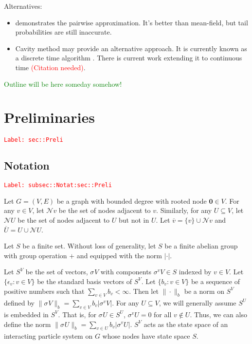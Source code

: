 \documentclass[12pt]{article}
\newcommand{\mc}{\mathcal}
\newcommand{\ov}{\overline}
\newcommand{\ep}{\epsilon}
\newcommand{\tr}{\textcolor{red}}
\newcommand{\tg}{\textcolor{green}}
\newcommand{\labe}[1]{\tr{\texttt{Label: #1}}}
\newcommand{\ind}{\hspace{24pt}}
\newcommand{\neigh}{\mc{N}}					%
\renewcommand{\root}{\mathbf{0}}				%
\renewcommand{\v}{v}							%
\renewcommand{\U}{U}							%
\newcommand{\cl}{\ov}							%
\renewcommand{\S}{S}							%
\newcommand{\s}{\sigma}							%
\newcommand{\sv}[1]{\s^{#1}}					%
\renewcommand{\b}[1]{b_{#1}}					%
\newcommand{\ev}[1]{\ep_{#1}}					%
\renewcommand{\G}{G}								%
\newcommand{\V}{V}									%
\newcommand{\E}{E}									%
\newcommand{\XState}[1]{\S^{#1}}				%
\begin{document}
Alternatives:

\begin{itemize}
\item \cite{Gas15} demonstrates the pairwise approximation. It's better than mean-field, but tail probabilities are still inaccurate.

\item Cavity method may provide an alternative approach. It is currently known as a discrete time algorithm \cite{Lac15}\cite{KanMon11}. There is current work extending it to continuous time \tr{(Citation needed)}.
\end{itemize}

\tg{Outline will be here someday somehow!}


\section{Preliminaries}
\label{sec::Preli}\labe{sec::Preli}

\subsection{Notation}
\label{subsec::Notat:sec::Preli}\labe{subsec::Notat:sec::Preli}

Let \(\G = (\V,\E)\) be a graph with bounded degree with rooted node \(\root \in \V\). For any \(\v \in \V\), let \(\neigh{\v}\) be the set of nodes adjacent to \(\v\). Similarly, for any \(\U \subseteq \V\), let \(\neigh{\U}\) be the set of nodes adjacent to \(\U\) but not in \(\U\). Let \(\cl{\v} = \{\v\}\cup\neigh{\v}\) and \(\cl{\U} = \U\cup \neigh{\U}\). 

\ind Let \(\S\) be a finite set. Without loss of generality, let \(S\) be a finite abelian group with group operation \(+\) and equipped with the norm \(|\cdot|\). 

\ind Let \(\S^\V\) be the set of vectors, \(\sv{}{\V}\) with components \(\sv{\v}{\V} \in \S\) indexed by \(\v\in \V\). Let \(\{\ev{\v}: \v\in \V\}\) be the standard basis vectors of \(\S^\V\). Let \(\{\b{\v}:\v\in \V\}\) be a sequence of positive numbers such that \(\sum_{\v\in\V} \b{\v} < \infty\). Then let \(\|\cdot\|_{\b{}}\) be a norm on \(\S^\V\) defined by \(\|\sv{}{\V}\|_{\b{}} = \sum_{\v\in\V} \b{\v}|\sv{\v}{\V}|\). For any \(\U\subseteq \V\), we will generally assume \(\S^\U\) is embedded in \(\S^\V\). That is, for \(\sv{}{\U}\in \S^\U\), \(\sv{\v}{\U} = 0\) for all \(\v\notin\U\). Thus, we can also define the norm \(\|\sv{}{\U}\|_{\b{}} = \sum_{\v\in\U} \b{\v}|\sv{\v}{\U}|\). \(\S^\V\) acts as the state space of an interacting particle system on \(\G\) whose nodes have state space \(\S\).
\end{document}
